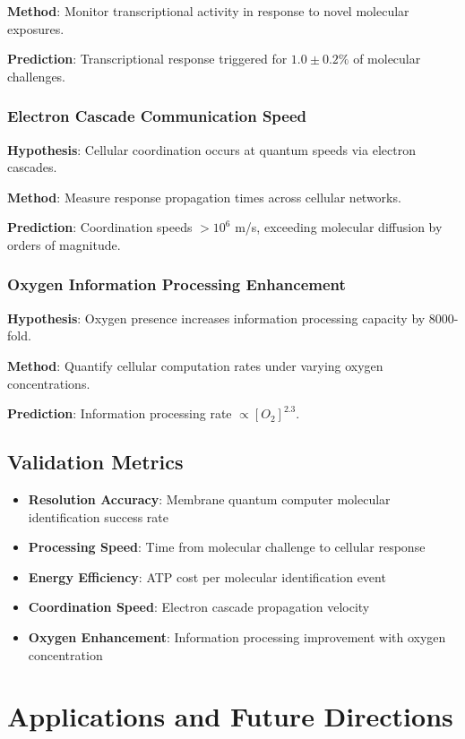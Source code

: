 \documentclass[12pt,a4paper]{article}
\begin{document}
\textbf{Method}: Monitor transcriptional activity in response to novel molecular exposures.

\textbf{Prediction}: Transcriptional response triggered for $1.0 \pm 0.2\%$ of molecular challenges.

\subsubsection{Electron Cascade Communication Speed}

\textbf{Hypothesis}: Cellular coordination occurs at quantum speeds via electron cascades.

\textbf{Method}: Measure response propagation times across cellular networks.

\textbf{Prediction}: Coordination speeds $> 10^6$ m/s, exceeding molecular diffusion by orders of magnitude.

\subsubsection{Oxygen Information Processing Enhancement}

\textbf{Hypothesis}: Oxygen presence increases information processing capacity by 8000-fold.

\textbf{Method}: Quantify cellular computation rates under varying oxygen concentrations.

\textbf{Prediction}: Information processing rate $\propto [O_2]^{2.3}$.

\subsection{Validation Metrics}

\begin{itemize}
\item \textbf{Resolution Accuracy}: Membrane quantum computer molecular identification success rate
\item \textbf{Processing Speed}: Time from molecular challenge to cellular response
\item \textbf{Energy Efficiency}: ATP cost per molecular identification event
\item \textbf{Coordination Speed}: Electron cascade propagation velocity
\item \textbf{Oxygen Enhancement}: Information processing improvement with oxygen concentration
\end{itemize}

\section{Applications and Future Directions}
\end{document}
